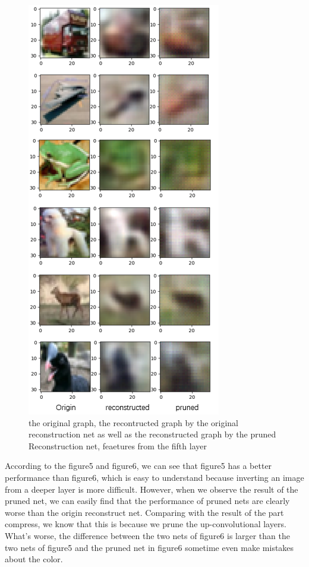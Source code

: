 \documentclass{acmtog} %
\begin{document}
\begin{figure}[h]
  \label{fig:res0}
  \centering
  \includegraphics[scale = 0.65]{graph/exp5_result.png}
  \caption{the original graph, the recontructed graph by the original reconstruction net as well as the reconstructed graph by the pruned Reconstruction net, feaetures from the fifth layer}
\end{figure}
According to the figure5 and figure6, we can see that figure5 has a better performance than figure6, which is easy to understand because inverting an image from a deeper layer is more difficult. However, when we observe the result of the pruned net, we can easily find that the performance of pruned nets are clearly worse than the origin reconstruct net. Comparing with the result of the part compress, we know that this is because we prune the up-convolutional layers. What's worse, the difference between the two nets of figure6 is larger than the two nets of figure5 and the pruned net in figure6 sometime even make mistakes about the color.
\end{document}
